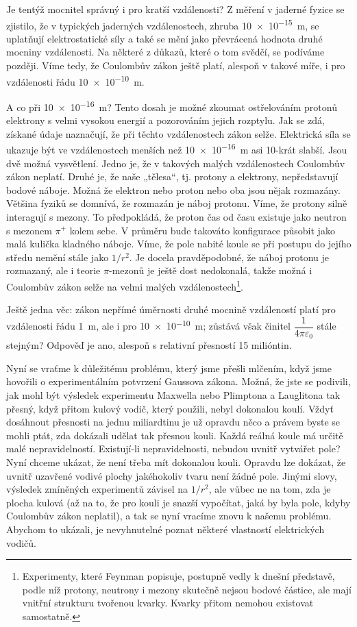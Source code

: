   Je tentýž mocnitel správný i pro kratší vzdálenosti? Z měření v jaderné fyzice se zjistilo, 
  že v typických jaderných vzdálenostech, zhruba \SI{10e-15}{\meter}, se uplatňují 
  elektrostatické síly a také se mění jako převrácená hodnota druhé mocniny vzdálenosti. Na 
  některé z důkazů, které o tom svědčí, se podíváme později. Víme tedy, že Coulombův zákon 
  ještě platí, alespoň v takové míře, i pro vzdálenosti řádu \SI{10e-10}{\meter}.
  
  A co při \SI{10e-16}{\meter}? Tento dosah je možné zkoumat ostřelováním protonů elektrony s 
  velmi vysokou energií a pozorováním jejich rozptylu. Jak se zdá, získané údaje naznačují, že 
  při těchto vzdálenostech zákon selže. Elektrická síla se ukazuje být ve vzdálenostech menších 
  než \SI{10e-16}{\meter} asi 10-krát slabší. Jsou dvě možná vysvětlení. Jedno je, že v 
  takových malých vzdálenostech Coulombův zákon neplatí. Druhé je, že naše „tělesa“, tj. 
  protony a elektrony, nepředstavují bodové náboje. Možná že elektron nebo proton nebo oba jsou 
  nějak rozmazány. Většina fyziků se domnívá, že rozmazán je náboj protonu. Víme, že protony 
  silně interagují s mezony. To předpokládá, že proton čas od času existuje jako neutron s 
  mezonem \(\pi^+\) kolem sebe. V průměru bude takováto konfigurace působit jako malá kulička 
  kladného náboje. Víme, že pole nabité koule se při postupu do jejího středu nemění stále jako 
  \(1/r^2\). Je docela pravděpodobné, že náboj protonu je rozmazaný, ale i teorie 
  \(\pi\text{-mezonů}\) je ještě dost nedokonalá, takže možná i Coulombův zákon selže na velmi 
  malých vzdálenostech\footnote{Experimenty, které Feynman popisuje, postupně vedly k dnešní 
  představě, podle níž protony, neutrony i mezony skutečně nejsou bodové částice, ale mají 
  vnitřní strukturu tvořenou kvarky. Kvarky přitom nemohou existovat samostatně.}.
  
  Ještě jedna věc: zákon nepřímé úměrnosti druhé mocnině vzdáleností platí pro vzdálenosti řádu 
  \SI{1}{\meter}, ale i pro \SI{10e-10}{\meter}; zůstává však činitel 
  \(\dfrac{1}{4\pi\varepsilon_0}\) stále stejným? Odpověď je ano, alespoň s relativní přesností 
  15 milióntin.
  
  Nyní se vraťme k důležitému problému, který jsme přešli mlčením, když jsme hovořili o 
  experimentálním potvrzení Gaussova zákona. Možná, že jste se podivili, jak mohl být výsledek 
  experimentu Maxwella nebo Plimptona a Lauglitona tak přesný, když přitom kulový vodič, který 
  použili, nebyl dokonalou koulí. Vždyť dosáhnout přesnosti na jednu miliardtinu je už opravdu 
  něco a právem byste se mohli ptát, zda dokázali udělat tak přesnou kouli. Každá reálná koule 
  má určitě malé nepravidelností. Existují-li nepravidelnosti, nebudou uvnitř vytvářet pole? 
  Nyní chceme ukázat, že není třeba mít dokonalou kouli. Opravdu lze dokázat, že uvnitř 
  uzavřené vodivé plochy jakéhokoliv tvaru není žádné pole. Jinými slovy, výsledek zmíněných 
  experimentů závisel na \(1/r^2\), ale vůbec ne na tom, zda je plocha kulová (až na to, že pro 
  kouli je snazší vypočítat, jaká by byla pole, kdyby Coulombův zákon neplatil), a tak se nyní 
  vracíme znovu k našemu problému. Abychom to ukázali, je nevyhnutelné poznat některé 
  vlastností elektrických vodičů.
  
